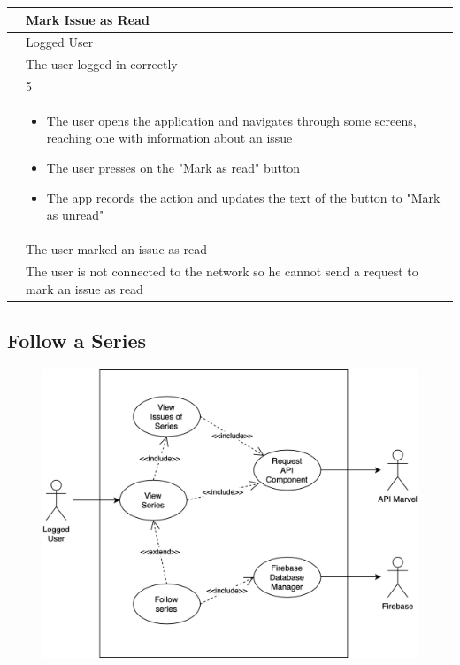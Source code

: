 {{{{{{{\renewcommand{\arraystretch}{2}
{\begin{center}
\begin{tabular}{ | m{4cm} | m{9cm} | } 
 \hline
 {\centering{\textbf{Name}}} & Mark Issue as Read \\
 \hline
 {\centering{\textbf{Actor}}} & Logged User \\
 \hline
 {\centering{\textbf{Entry Condition}}} & The user logged in correctly \\
 \hline
 {\centering{\textbf{Goal}}} & 5 \\
 \hline
 {\centering{\textbf{Event flow}}} & \begin{itemize}[leftmargin=*]
 	\item The user opens the application and navigates through some screens, reaching one with information about an issue
	\item The user presses on the "Mark as read" button 
	\item The app records the action and updates the text of the button to "Mark as unread"
	\end{itemize} \\	
 \hline
 {\centering{\textbf{Exit condition}}} & The user marked an issue as read \\
 \hline
 {\centering{\textbf{Exceptions}}} & The user is not connected to the network so he cannot send a request to mark an issue as read \\
 \hline
\end{tabular}
\end{center}}

\clearpage

\subsection{Follow a Series}
\begin{figure}[h]
\centering
\includegraphics[width=\textwidth]{img/usecases/followseries}
\end{figure}

}}}}}}}
